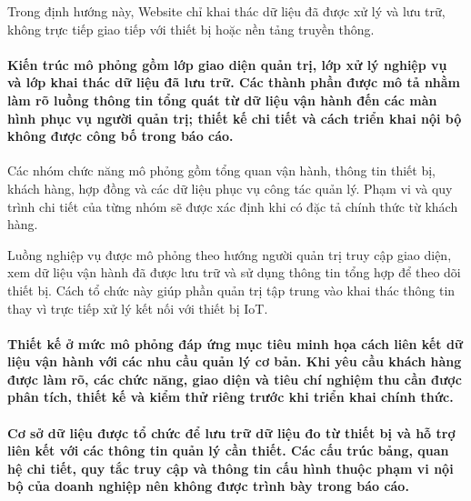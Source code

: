 Trong định hướng này, Website chỉ khai thác dữ liệu đã được xử lý và lưu trữ, không trực tiếp giao tiếp với thiết bị hoặc nền tảng truyền thông.

\paragraph{
Kiến trúc mô phỏng gồm lớp giao diện quản trị, lớp xử lý nghiệp vụ và lớp khai thác dữ liệu đã lưu trữ. Các thành phần được mô tả nhằm làm rõ luồng thông tin tổng quát từ dữ liệu vận hành đến các màn hình phục vụ người quản trị; thiết kế chi tiết và cách triển khai nội bộ không được công bố trong báo cáo.
}


Các nhóm chức năng mô phỏng gồm tổng quan vận hành, thông tin thiết bị, khách hàng, hợp đồng và các dữ liệu phục vụ công tác quản lý. Phạm vi và quy trình chi tiết của từng nhóm sẽ được xác định khi có đặc tả chính thức từ khách hàng.


Luồng nghiệp vụ được mô phỏng theo hướng người quản trị truy cập giao diện, xem dữ liệu vận hành đã được lưu trữ và sử dụng thông tin tổng hợp để theo dõi thiết bị. Cách tổ chức này giúp phần quản trị tập trung vào khai thác thông tin thay vì trực tiếp xử lý kết nối với thiết bị IoT.

\paragraph{
Thiết kế ở mức mô phỏng đáp ứng mục tiêu minh họa cách liên kết dữ liệu vận hành với các nhu cầu quản lý cơ bản. Khi yêu cầu khách hàng được làm rõ, các chức năng, giao diện và tiêu chí nghiệm thu cần được phân tích, thiết kế và kiểm thử riêng trước khi triển khai chính thức.
}

\paragraph{
Cơ sở dữ liệu được tổ chức để lưu trữ dữ liệu đo từ thiết bị và hỗ trợ liên kết với các thông tin quản lý cần thiết. Các cấu trúc bảng, quan hệ chi tiết, quy tắc truy cập và thông tin cấu hình thuộc phạm vi nội bộ của doanh nghiệp nên không được trình bày trong báo cáo.
}

